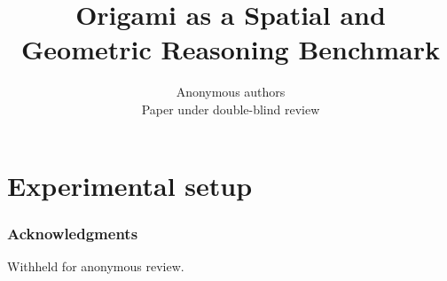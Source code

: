 \documentclass{article} %
\title{Origami as a Spatial and Geometric Reasoning Benchmark}
\author{Anonymous authors \\
Paper under double-blind review}
\newif\ifdraftnotes
\begin{document}
\maketitle







\section{Experimental setup}
\label{sec:experimental-setup}







\ifdraftnotes

\fi



\subsubsection*{Acknowledgments}

Withheld for anonymous review.




\appendix






\ifdraftnotes

% 
\fi
\end{document}
